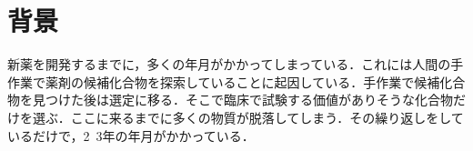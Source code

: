 
\chapter{背景}
\label{cha:previous}
新薬を開発するまでに，多くの年月がかかってしまっている．これには人間の手作業で薬剤の候補化合物を探索していることに起因している．手作業で候補化合物を見つけた後は選定に移る．そこで臨床で試験する価値がありそうな化合物だけを選ぶ．ここに来るまでに多くの物質が脱落してしまう．その繰り返しをしているだけで，2~3年の年月がかかっている．
\quad
